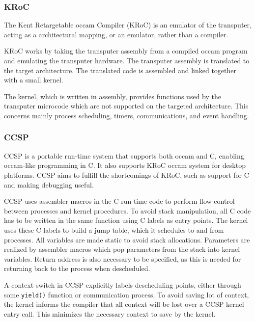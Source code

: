 \subsubsection{KRoC}
\label{sssec:kroc}

The Kent Retargetable occam Compiler (KRoC) \citep{kroc} is an emulator of the transputer, acting as a architectural mapping, or an emulator, rather than a compiler.

KRoC works by taking the transputer assembly from a compiled occam program and emulating the transputer hardware. The transputer assembly is translated to the target architecture. The translated code is assembled and linked together with a small kernel. 

The kernel, which is written in assembly, provides functions used by the transputer microcode which are not supported on the targeted architecture. This concerns mainly process scheduling, timers, communications, and event handling.


\subsubsection{CCSP}
\label{sssec:ccsp}

CCSP \citep{ccsp} is a portable run-time system that supports both occam and C, enabling occam-like programming in C. It also supports KRoC occam system for desktop platforms. CCSP aims to fulfill the shortcomings of KRoC, such as support for C and making debugging useful.

CCSP uses assembler macros in the C run\hyp{}time code to perform flow control between processes and kernel procedures. To avoid stack manipulation, all C code has to be written in the same function using C labels as entry points. The kernel uses these C labels to build a jump table, which it schedules to and from processes. All variables are made static to avoid stack allocations. Parameters are realized by assembler macros which pop parameters from the stack into kernel variables. Return address is also necessary to be specified, as this is needed for returning back to the process when descheduled. 

A context switch in CCSP explicitly labels descheduling points, either through some \texttt{yield()} function or communication process. To avoid saving lot of context, the kernel informs the compiler that all context will be lost over a CCSP kernel entry call. This minimizes the necessary context to save by the kernel. 

